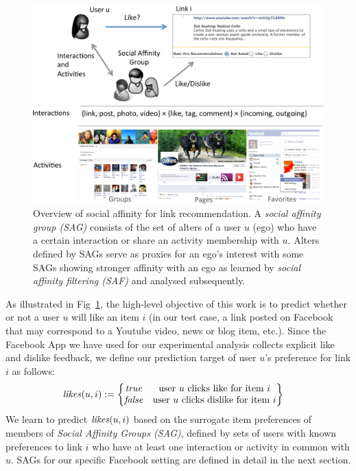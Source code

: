 
\begin{figure}[t!]
\centering
\includegraphics[width=1\linewidth]{data/overview}
\caption{Overview of social affinity for link recommendation.
A \emph{social affinity group (SAG)} consists of the set of alters 
of a user $u$ (ego) who have a
certain interaction or share an activity membership with $u$.
Alters defined by SAGs serve as proxies for an ego's interest with some
SAGs showing stronger affinity with an ego as learned by \emph{social affinity filtering (SAF)}
and analysed subsequently.}
\label{fig:overview}
\end{figure}

As illustrated in Fig~\ref{fig:overview}, the high-level objective of
this work is to predict whether or not a user $u$ will like an item
$i$ (in our test case, a link posted on Facebook that may correspond
to a Youtube video, news or blog item, etc.).  Since the Facebook App
we have used for our experimental analysis collects explicit like and
dislike feedback, we define our prediction target of user $u$'s
preference for link $i$ as follows:
\begin{align*}
\likes(u,i) & :=  \begin{Bmatrix}
	  \true & \text{user $u$ clicks like for item $i$}\\
	  \false & \text{user $u$ clicks dislike for item $i$}
	  \end{Bmatrix}
\end{align*}
We learn to predict $\like(u,i)$ based on the surrogate item
preferences of members of \textit{Social Affinity Groups (SAG)},
defined by sets of users with known preferences to link $i$ who have
at least one interaction or activity in common with $u$.  SAGs for our
specific Facebook setting are defined in detail in the next section.

